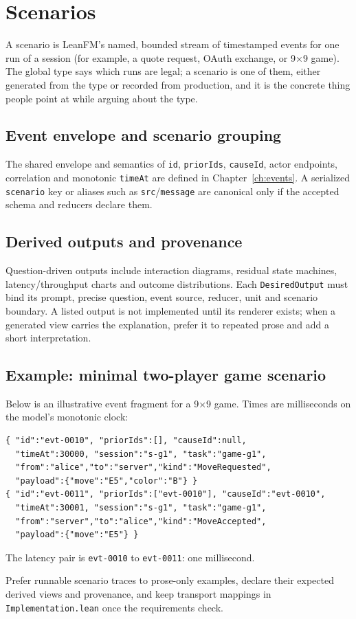 \chapter{Scenarios}
\label{ch:scenarios}

A scenario is LeanFM's named, bounded stream of timestamped events for one
run of a session (for example, a quote request, OAuth exchange, or 9×9 game).
The global type says which runs are legal; a scenario is one of them, either
generated from the type or recorded from production, and it is the concrete
thing people point at while arguing about the type.

\section{Event envelope and scenario grouping}
The shared envelope and semantics of \texttt{id}, \texttt{priorIds},
\texttt{causeId}, actor endpoints, correlation and monotonic \texttt{timeAt}
are defined in Chapter~\ref{ch:events}. A serialized \texttt{scenario} key or
aliases such as \texttt{src}/\texttt{message} are canonical only if the accepted
schema and reducers declare them.

\section{Derived outputs and provenance}
Question-driven outputs include interaction diagrams, residual state machines,
latency/throughput charts and outcome distributions. Each \texttt{DesiredOutput}
must bind its prompt, precise question, event source, reducer, unit and scenario
boundary. A listed output is not implemented until its renderer exists; when a
generated view carries the explanation, prefer it to repeated prose and add a
short interpretation.

\section{Example: minimal two-player game scenario}
Below is an illustrative event fragment for a 9×9 game. Times are milliseconds
on the model's monotonic clock:
\begin{verbatim}
{ "id":"evt-0010", "priorIds":[], "causeId":null,
  "timeAt":30000, "session":"s-g1", "task":"game-g1",
  "from":"alice","to":"server","kind":"MoveRequested",
  "payload":{"move":"E5","color":"B"} }
{ "id":"evt-0011", "priorIds":["evt-0010"], "causeId":"evt-0010",
  "timeAt":30001, "session":"s-g1", "task":"game-g1",
  "from":"server","to":"alice","kind":"MoveAccepted",
  "payload":{"move":"E5"} }
\end{verbatim}

The latency pair is \texttt{evt-0010} to \texttt{evt-0011}: one millisecond.

Prefer runnable scenario traces to prose-only examples, declare their expected
derived views and provenance, and keep transport mappings in
\texttt{Implementation.lean} once the requirements check.
